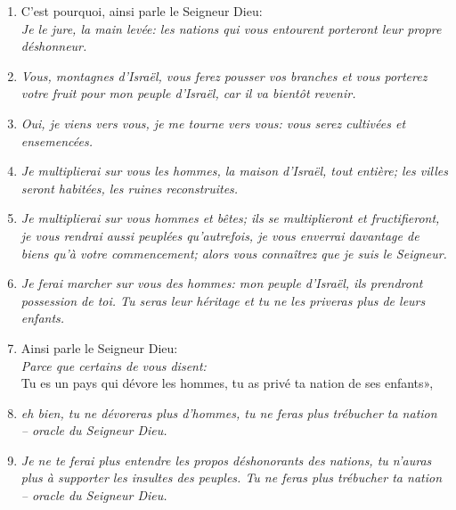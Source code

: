 \begin{enumerate}[leftmargin=\psleftmargin, labelsep = \pslabelsep, label={\arabic*}, font=\color{\pscolor}\small\textsuperscript, parsep=0em, itemsep=0em, topsep=0em ]
{          à cause du déshonneur que vous ont infligé les nations.}
  \item {}C’est pourquoi, ainsi parle le Seigneur Dieu: \\
        \textit{Je le jure, la main levée: \brk
          les nations qui vous entourent porteront leur propre déshonneur.}\verseSpace
  \item {}\textit{ Vous, montagnes d’Israël, vous ferez pousser vos branches \brk
          et vous porterez votre fruit pour mon peuple d’Israël, \brk
          car il va bientôt revenir.}
  \item {}\textit{ Oui, je viens vers vous, \brk
          je me tourne vers vous: \brk
          vous serez cultivées et ensemencées.}
  \item {}\textit{ Je multiplierai sur vous les hommes, \brk
          la maison d’Israël, tout entière; \brk
          les villes seront habitées, \brk
          les ruines reconstruites.}
  \item {}\textit{ Je multiplierai sur vous hommes et bêtes; \brk
          ils se multiplieront et fructifieront, \brk
          je vous rendrai aussi peuplées qu’autrefois, \brk
          je vous enverrai davantage de biens qu’à votre commencement; \brk
          alors vous connaîtrez que je suis le Seigneur.}
  \item {}\textit{Je ferai marcher sur vous des hommes: mon peuple d’Israël, \brk
          ils prendront possession de toi. \brk
          Tu seras leur héritage \brk
          et tu ne les priveras plus de leurs enfants.} \parSpace
  \item {}Ainsi parle le Seigneur Dieu: \\
        \textit{Parce que certains de vous disent:} \\
        Tu es un pays qui dévore les hommes, \brk
        tu as privé ta nation de ses enfants»,
  \item {}\textit{ eh bien, tu ne dévoreras plus d’hommes, \brk
          tu ne feras plus trébucher ta nation \\
          – oracle du Seigneur Dieu.}
  \item {}\textit{Je ne te ferai plus entendre les propos déshonorants des nations, \brk
          tu n’auras plus à supporter les insultes des peuples. \brk
          Tu ne feras plus trébucher ta nation \\
          – oracle du Seigneur Dieu.} \parSpace

\end{enumerate}
